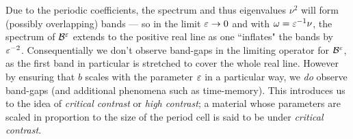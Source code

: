 Due to the periodic coefficients, the spectrum and thus eigenvalues $\nu^2$ will form (possibly overlapping) bands --- so in the limit $\varepsilon\rightarrow0$ and with $\omega = \varepsilon^{-1}\nu$, the spectrum of $\mathcal{B}^{\varepsilon}$ extends to the positive real line as one ``inflates" the bands by $\varepsilon^{-2}$.
Consequentially we don't observe band-gaps in the limiting operator for $\mathcal{B}^{\varepsilon}$, as the first band in particular is stretched to cover the whole real line.
However by ensuring that $b$ scales with the parameter $\varepsilon$ in a particular way, we \emph{do} observe band-gaps (and additional phenomena such as time-memory).
This introduces us to the idea of \emph{critical contrast} or \emph{high contrast}; a material whose parameters are scaled in proportion to the size of the period cell is said to be under \emph{critical contrast}. 

